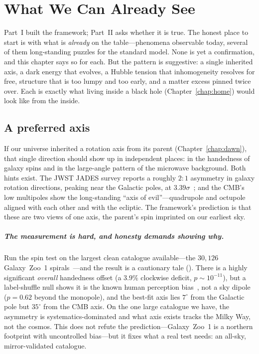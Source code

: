 \chapter{What We Can Already See}
\label{chap:nowobs}

Part~I built the framework; Part~II asks whether it is true. The honest place to
start is with what is \emph{already} on the table---phenomena observable today,
several of them long-standing puzzles for the standard model. None is yet a
confirmation, and this chapter says so for each. But the pattern is suggestive:
a single inherited axis, a dark energy that evolves, a Hubble tension that
inhomogeneity resolves for free, structure that is too lumpy and too early, and a
matter excess pinned twice over. Each is exactly what living inside a black hole
(Chapter~\ref{chap:home}) would look like from the inside.

\section{A preferred axis}
\label{sec:axis}

If our universe inherited a rotation axis from its parent (Chapter~\ref{chap:dawn}),
that single direction should show up in independent places: in the handedness of
galaxy spins and in the large-angle pattern of the microwave background. Both
hints exist. The JWST JADES survey reports a roughly $2\!:\!1$ asymmetry in
galaxy rotation directions, peaking near the Galactic poles, at
$3.39\sigma$~\citep{shamir2025}; and the CMB's low multipoles show the
long-standing ``axis of evil''---quadrupole and octupole aligned with each other
and with the ecliptic. The framework's prediction is that these are two views of
one axis, the parent's spin imprinted on our earliest sky.

\paragraph{The measurement is hard, and honesty demands showing why.} Run the spin
test on the largest clean catalogue available---the $30{,}126$ Galaxy~Zoo~1
spirals~\citep{lintott2011}---and the result is a cautionary tale
(). There is a highly significant \emph{overall} handedness
offset (a $3.9\%$ clockwise deficit, $p\sim10^{-11}$), but a label-shuffle null
shows it is the known human perception bias~\citep{land2008}, not a sky dipole
($p=0.62$ beyond the monopole), and the best-fit axis lies $7^\circ$ from the
Galactic pole but $35^\circ$ from the CMB axis. On the one large catalogue we
have, the asymmetry is systematics-dominated and what axis exists tracks the Milky
Way, not the cosmos. This does not refute the prediction---Galaxy~Zoo~1 is a
northern footprint with uncontrolled bias---but it fixes what a real test needs:
an all-sky, mirror-validated catalogue.

